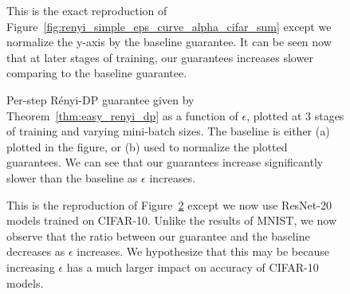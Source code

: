 \begin{figure}[t]
\centering
{}


\caption{This is the exact reproduction of Figure~\ref{fig:renyi_simple_eps_curve_alpha_cifar_sum} except we normalize the y-axis by the baseline guarantee. It can be seen now that at later stages of training, our guarantees increases slower comparing to the baseline guarantee.
}
\label{fig:renyi_simple_fraction_eps_curve_alpha_cifar_sum}
\end{figure}

\begin{figure}[t]
\centering
{}

\caption{Per-step R\'enyi-DP guarantee given by Theorem~\ref{thm:easy_renyi_dp} as a function of $\epsilon$, plotted at 3 stages of training and varying mini-batch sizes. The baseline is either (a) plotted in the figure, or (b) used to normalize the plotted guarantees. We can see that our guarantees increase significantly slower than the baseline as  $\epsilon$ increases.
}
\label{fig:renyi_simple_fraction_eps_curve_vary_eps_mnist_sum}
\end{figure}

\begin{figure}[t]
\centering
{}

\caption{This is the reproduction of Figure~\ref{fig:renyi_simple_fraction_eps_curve_vary_eps_mnist_sum} except we now use ResNet-20 models trained on CIFAR-10. Unlike the results of MNIST, we now observe that the ratio between our guarantee and the baseline decreases as $\epsilon$ increases. We hypothesize that this may be because increasing  $\epsilon$ has a much larger impact on accuracy of CIFAR-10 models.
}
\label{fig:renyi_simple_fraction_eps_curve_vary_eps_cifar_sum}
\end{figure}



